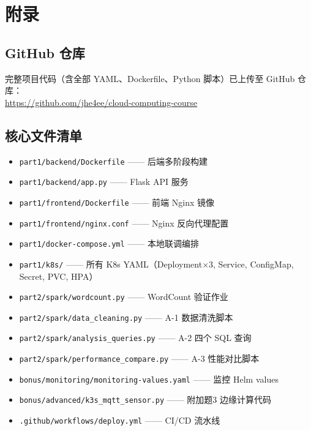 \documentclass[12pt,a4paper]{ctexart}
\begin{document}
\section{附录}
\subsection{GitHub 仓库}
完整项目代码（含全部 YAML、Dockerfile、Python 脚本）已上传至 GitHub 仓库：\\
\url{https://github.com/jhe4ee/cloud-computing-course}

\subsection{核心文件清单}
\begin{itemize}[nosep]
  \item \texttt{part1/backend/Dockerfile} —— 后端多阶段构建
  \item \texttt{part1/backend/app.py} —— Flask API 服务
  \item \texttt{part1/frontend/Dockerfile} —— 前端 Nginx 镜像
  \item \texttt{part1/frontend/nginx.conf} —— Nginx 反向代理配置
  \item \texttt{part1/docker-compose.yml} —— 本地联调编排
  \item \texttt{part1/k8s/} —— 所有 K8s YAML（Deployment×3, Service, ConfigMap, Secret, PVC, HPA）
  \item \texttt{part2/spark/wordcount.py} —— WordCount 验证作业
  \item \texttt{part2/spark/data\_cleaning.py} —— A-1 数据清洗脚本
  \item \texttt{part2/spark/analysis\_queries.py} —— A-2 四个 SQL 查询
  \item \texttt{part2/spark/performance\_compare.py} —— A-3 性能对比脚本
  \item \texttt{bonus/monitoring/monitoring-values.yaml} —— 监控 Helm values
  \item \texttt{bonus/advanced/k3s\_mqtt\_sensor.py} —— 附加题3 边缘计算代码
  \item \texttt{.github/workflows/deploy.yml} —— CI/CD 流水线
\end{itemize}
\end{document}
